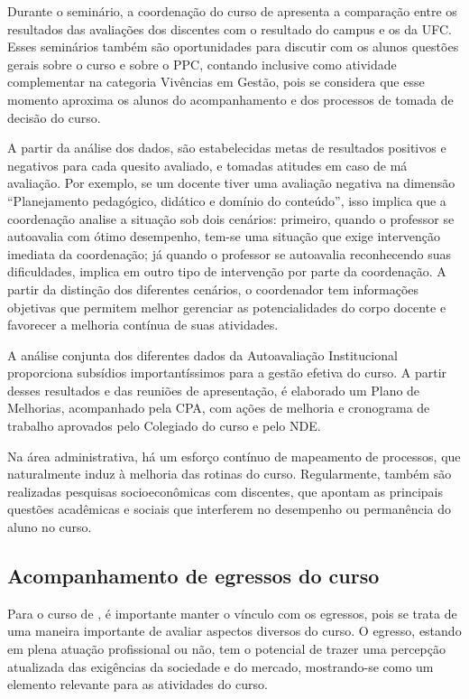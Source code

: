 Durante o seminário, a coordenação do curso de \nomedocurso apresenta a comparação entre os resultados das avaliações dos discentes com o resultado do campus e os da UFC. Esses seminários também são oportunidades para discutir com os alunos questões gerais sobre o curso e sobre o PPC, contando inclusive como atividade complementar na categoria Vivências em Gestão, pois se considera que esse momento aproxima os alunos do acompanhamento e dos processos de tomada de decisão do curso.

A partir da análise dos dados, são estabelecidas metas de resultados positivos e negativos para cada quesito avaliado, e tomadas atitudes em caso de má avaliação. Por exemplo, se um docente tiver uma avaliação negativa na dimensão ``Planejamento pedagógico, didático e domínio do conteúdo'', isso implica que a coordenação analise a situação sob dois cenários: primeiro, quando o professor se autoavalia com ótimo desempenho, tem-se uma situação que exige intervenção imediata da coordenação; já quando o professor se autoavalia reconhecendo suas dificuldades, implica em outro tipo de intervenção por parte da coordenação. A partir da distinção dos diferentes cenários, o coordenador tem informações objetivas que permitem melhor gerenciar as potencialidades do corpo docente e favorecer a melhoria contínua de suas atividades.

A análise conjunta dos diferentes dados da Autoavaliação Institucional proporciona subsídios importantíssimos para a gestão efetiva do curso. A partir desses resultados e das reuniões de apresentação, é elaborado um Plano de Melhorias, acompanhado pela CPA, com ações de melhoria e cronograma de trabalho aprovados pelo Colegiado do curso e pelo NDE.

Na área administrativa, há um esforço contínuo de mapeamento de processos, que naturalmente induz à melhoria das rotinas do curso. Regularmente, também são realizadas pesquisas socioeconômicas com discentes, que apontam as principais questões acadêmicas e sociais que interferem no desempenho ou permanência do aluno no curso.

\subsection{Acompanhamento de egressos do curso}

Para o curso de \nomedocurso, é importante manter o vínculo com os egressos, pois se trata de uma maneira importante de avaliar aspectos diversos do curso. O egresso, estando em plena atuação profissional ou não, tem o potencial de trazer uma percepção atualizada das exigências da sociedade e do mercado, mostrando-se como um elemento relevante para as atividades do curso.

